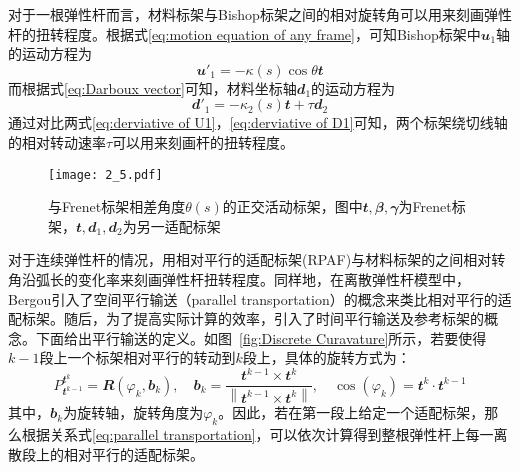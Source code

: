 对于一根弹性杆而言，材料标架与Bishop标架之间的相对旋转角可以用来刻画弹性杆的扭转程度。根据式\eqref{eq:motion equation of any frame}，可知Bishop标架中$\mathbfit{u}_1$轴的运动方程为
\begin{equation}
	\mathbfit{u}'_1= -\kappa (s) \cos \theta \mathbfit{t}
	\label{eq:derviative of U1}
\end{equation}
而根据式\eqref{eq:Darboux vector}可知，材料坐标轴$\mathbfit{d}_1$的运动方程为
\begin{equation}
	\mathbfit{d}'_1= -\kappa_2 (s) \mathbfit{t}+\tau\mathbfit{d}_2
	\label{eq:derviative of D1}
\end{equation}
通过对比两式\eqref{eq:derviative of U1}，\eqref{eq:derviative of D1}可知，两个标架绕切线轴的相对转动速率$\tau$可以用来刻画杆的扭转程度。

\begin{figure}
	\centering
	\texttt{[image: 2\_5.pdf]}
	\caption{与Frenet标架相差角度$\theta(s)$的正交活动标架，图中$\mathbfit{t},\mathbfit{\beta},\mathbfit{\gamma}$为Frenet标架，$\mathbfit{t},\mathbfit{d}_1,\mathbfit{d}_2$为另一适配标架}
	\label{fig:Adapted Frame}
\end{figure}
对于连续弹性杆的情况，用相对平行的适配标架(RPAF)与材料标架的之间相对转角沿弧长的变化率来刻画弹性杆扭转程度。同样地，在离散弹性杆模型中，Bergou\cite{bergou2008discrete}引入了空间平行输送（parallel transportation）的概念来类比相对平行的适配标架。随后，为了提高实际计算的效率，引入了时间平行输送及参考标架的概念\cite{bergou2010discrete}。下面给出平行输送的定义。如图~\ref{fig:Discrete Curavature}所示，若要使得$k-1$段上一个标架相对平行的转动到$k$段上，具体的旋转方式为：
\begin{equation}
	P^{\mathbfit{t}^k}_{\mathbfit{t}^{k-1}}=\mathbfit{R}(\varphi_k,\mathbfit{b}_k),\quad \mathbfit{b}_{k}=\frac{\mathbfit{t}^{k-1} \times \mathbfit{t}^{k}}{\left\|\mathbfit{t}^{k-1} \times \mathbfit{t}^{k}\right\|}, \quad \cos \left(\varphi_{k}\right)=\mathbfit{t}^{k} \cdot \mathbfit{t}^{k-1}
	\label{eq:parallel transportation}
\end{equation}
其中，$\mathbfit{b}_k$为旋转轴，旋转角度为$\varphi_k$。因此，若在第一段上给定一个适配标架，那么根据关系式\eqref{eq:parallel transportation}，可以依次计算得到整根弹性杆上每一离散段上的相对平行的适配标架。

